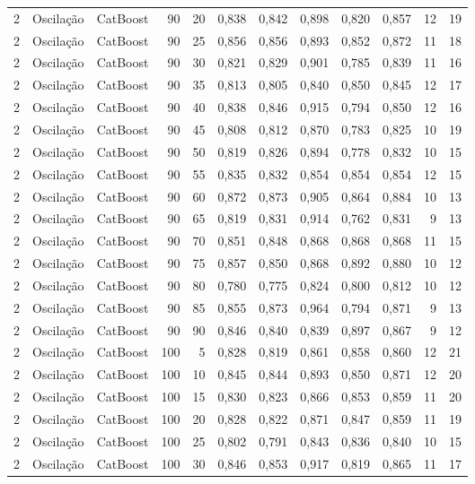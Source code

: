 \begin{longtable}{@{}rllrrrrrrrrr@{}}
2 & Oscilação & CatBoost & 90 & 20 & 0,838 & 0,842 & 0,898 & 0,820 & 0,857 & 12 & 19 \\
2 & Oscilação & CatBoost & 90 & 25 & 0,856 & 0,856 & 0,893 & 0,852 & 0,872 & 11 & 18 \\
2 & Oscilação & CatBoost & 90 & 30 & 0,821 & 0,829 & 0,901 & 0,785 & 0,839 & 11 & 16 \\
2 & Oscilação & CatBoost & 90 & 35 & 0,813 & 0,805 & 0,840 & 0,850 & 0,845 & 12 & 17 \\
2 & Oscilação & CatBoost & 90 & 40 & 0,838 & 0,846 & 0,915 & 0,794 & 0,850 & 12 & 16 \\
2 & Oscilação & CatBoost & 90 & 45 & 0,808 & 0,812 & 0,870 & 0,783 & 0,825 & 10 & 19 \\
2 & Oscilação & CatBoost & 90 & 50 & 0,819 & 0,826 & 0,894 & 0,778 & 0,832 & 10 & 15 \\
2 & Oscilação & CatBoost & 90 & 55 & 0,835 & 0,832 & 0,854 & 0,854 & 0,854 & 12 & 15 \\
2 & Oscilação & CatBoost & 90 & 60 & 0,872 & 0,873 & 0,905 & 0,864 & 0,884 & 10 & 13 \\
2 & Oscilação & CatBoost & 90 & 65 & 0,819 & 0,831 & 0,914 & 0,762 & 0,831 & 9 & 13 \\
2 & Oscilação & CatBoost & 90 & 70 & 0,851 & 0,848 & 0,868 & 0,868 & 0,868 & 11 & 15 \\
2 & Oscilação & CatBoost & 90 & 75 & 0,857 & 0,850 & 0,868 & 0,892 & 0,880 & 10 & 12 \\
2 & Oscilação & CatBoost & 90 & 80 & 0,780 & 0,775 & 0,824 & 0,800 & 0,812 & 10 & 12 \\
2 & Oscilação & CatBoost & 90 & 85 & 0,855 & 0,873 & 0,964 & 0,794 & 0,871 & 9 & 13 \\
2 & Oscilação & CatBoost & 90 & 90 & 0,846 & 0,840 & 0,839 & 0,897 & 0,867 & 9 & 12 \\
2 & Oscilação & CatBoost & 100 & 5 & 0,828 & 0,819 & 0,861 & 0,858 & 0,860 & 12 & 21 \\
2 & Oscilação & CatBoost & 100 & 10 & 0,845 & 0,844 & 0,893 & 0,850 & 0,871 & 12 & 20 \\
2 & Oscilação & CatBoost & 100 & 15 & 0,830 & 0,823 & 0,866 & 0,853 & 0,859 & 11 & 20 \\
2 & Oscilação & CatBoost & 100 & 20 & 0,828 & 0,822 & 0,871 & 0,847 & 0,859 & 11 & 19 \\
2 & Oscilação & CatBoost & 100 & 25 & 0,802 & 0,791 & 0,843 & 0,836 & 0,840 & 10 & 15 \\
2 & Oscilação & CatBoost & 100 & 30 & 0,846 & 0,853 & 0,917 & 0,819 & 0,865 & 11 & 17 \\

\end{longtable}
